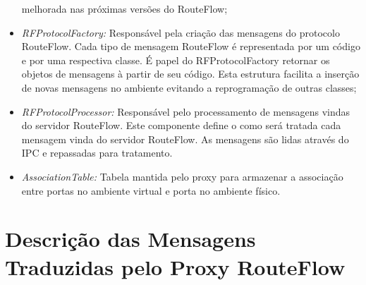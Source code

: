 \begin{itemize}
melhorada nas próximas versões do RouteFlow;
\item \textit{RFProtocolFactory:} Responsável pela criação das mensagens do protocolo RouteFlow. Cada 
tipo de mensagem RouteFlow é representada por um código e por uma respectiva classe. É papel do 
RFProtocolFactory retornar os objetos de mensagens à partir de seu código. Esta estrutura facilita a 
inserção de novas mensagens no ambiente evitando a reprogramação de outras classes;
\item \textit{RFProtocolProcessor:} Responsável pelo processamento de mensagens vindas do servidor 
RouteFlow. Este componente define o como será tratada cada mensagem vinda do servidor RouteFlow. As 
mensagens são lidas através do IPC e repassadas para tratamento.
\item \textit{AssociationTable:} Tabela mantida pelo proxy para armazenar a associação entre portas no 
ambiente virtual e porta no ambiente físico.
\end{itemize} 

\section{Descrição das Mensagens Traduzidas pelo Proxy RouteFlow}

